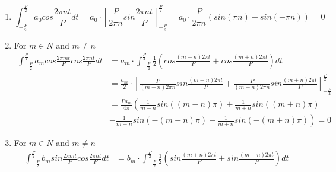 \documentclass[titlepage]{article}
\begin{document}
    \begin{enumerate}
        \item \begin{equation*}
                \int_{-\frac{P}{2}}^{\frac{P}{2}}a_0cos\frac{2\pi nt}{P}dt
                = a_0 \cdot \left[\frac{P}{2\pi n}sin\frac{2\pi nt}{P}\right]_{-\frac{P}{2}}^{\frac{P}{2}}
                = a_0 \cdot \frac{P}{2\pi n}(sin(\pi n) - sin(-\pi n)) = 0
              \end{equation*}
        \item For $m \in N$ and $m \neq n$
            \begin{equation*}
            \begin{split}
                \int_{-\frac{P}{2}}^{\frac{P}{2}} a_mcos \frac{2\pi mt}{P} 
                cos\frac{2\pi nt}{P} dt %
                & = a_m \cdot \int_{-\frac{P}{2}}^{\frac{P}{2}} \frac{1}{2} 
                \left( cos\frac{(m-n)2 \pi t}{P} 
                + cos\frac{(m+n)2 \pi t}{P} \right) dt \\%
                & = \frac{a_m}{2} \cdot \left[ \frac{P}{(m-n)2\pi n}
                sin\frac{(m-n)2 \pi t}{P} + \frac{P}{(m+n)2\pi n} 
                sin\frac{(m+n)2 \pi t}{P}  \right]_{-\frac{P}{2}}^{\frac{P}{2}} \\%
                & = \frac{Pa_m}{4\pi} \left( \frac{1}{m-n}sin((m-n)\pi)
                + \frac{1}{m+n} sin((m+n)\pi) \right. \\
                & \left. - \frac{1}{m-n} sin(-(m-n)\pi) - \frac{1}{m+n} 
                sin(-(m+n)\pi) \right) = 0
            \end{split}
            \end{equation*}
        \item For $m \in N$ and $m \neq n$
            \begin{equation*}
            \begin{split}
                \int_{-\frac{P}{2}}^{\frac{P}{2}} b_msin \frac{2\pi mt}{P} 
                cos\frac{2\pi nt}{P}dt %
                & = b_m \cdot \int_{-\frac{P}{2}}^{\frac{P}{2}}\frac{1}{2} 
                \left(sin\frac{(m+n)2 \pi t}{P} + 
                sin\frac{(m-n)2 \pi t}{P}\right)dt \\ %

\end{split}
\end{equation*}
\end{enumerate}
\end{document}
